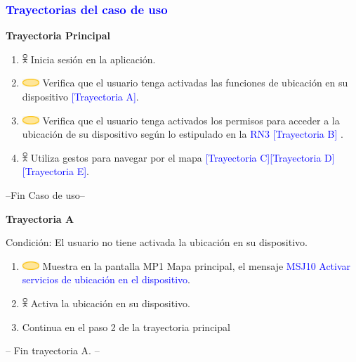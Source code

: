 \subsubsection{\textcolor{blue}{Trayectorias del caso de uso}}
\textbf{Trayectoria Principal}
    \begin{enumerate}
        \item \includegraphics[width=0.0150\textwidth]{Figuras/persona.png} Inicia sesión en la aplicación.
        \item \includegraphics[width=0.0500\textwidth]{Figuras/sistema.png} Verifica que el usuario tenga activadas las funciones de ubicación en su dispositivo {\textcolor{blue}{[Trayectoria A]}}.
        \item \includegraphics[width=0.0500\textwidth]{Figuras/sistema.png} Verifica que el usuario tenga activados los permisos para acceder a la ubicación de su dispositivo según lo estipulado en la {\textcolor{blue}{RN3}} {\textcolor{blue}{[Trayectoria B]}} .
        \item \includegraphics[width=0.0150\textwidth]{Figuras/persona.png} Utiliza gestos para navegar por el mapa \textcolor{blue}{[Trayectoria C][Trayectoria D][Trayectoria E]}.
    \end{enumerate}

    --Fin Caso de uso--

\textbf{Trayectoria A}

Condición: El usuario no tiene activada la ubicación en su dispositivo.
\begin{enumerate}
    \item \includegraphics[width=0.0500\textwidth]{Figuras/sistema.png} Muestra en la pantalla MP1 Mapa principal, el mensaje {\textcolor{blue}{MSJ10 Activar servicios de ubicación en el dispositivo}}.
    \item \includegraphics[width=0.0150\textwidth]{Figuras/persona.png} Activa la ubicación en su dispositivo.
    \item Continua en el paso  2 de la trayectoria principal
\end{enumerate}
-- Fin trayectoria A. --\\


